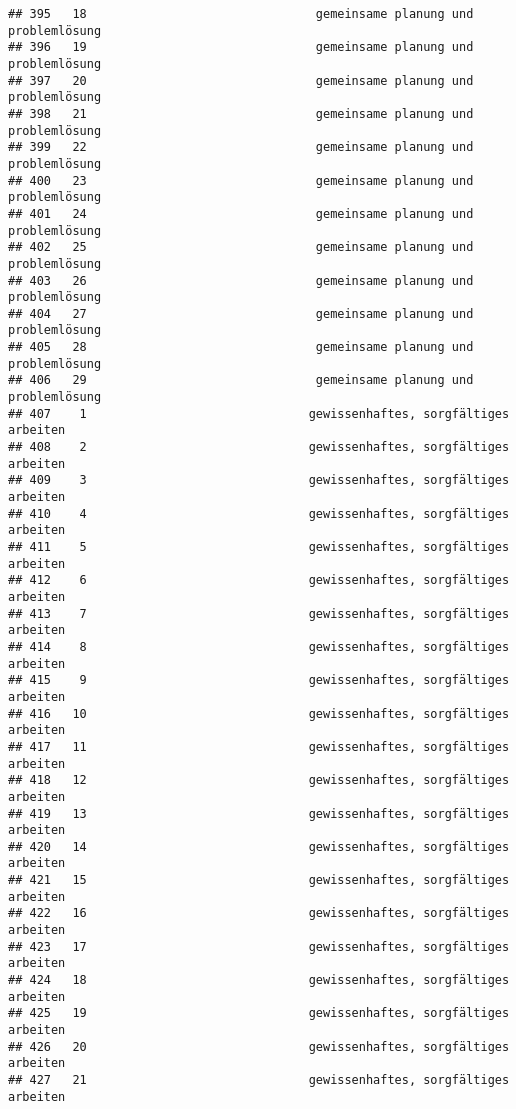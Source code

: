 \documentclass[
]{article}
\begin{document}
\begin{verbatim}
## 395   18                                gemeinsame planung und problemlösung
## 396   19                                gemeinsame planung und problemlösung
## 397   20                                gemeinsame planung und problemlösung
## 398   21                                gemeinsame planung und problemlösung
## 399   22                                gemeinsame planung und problemlösung
## 400   23                                gemeinsame planung und problemlösung
## 401   24                                gemeinsame planung und problemlösung
## 402   25                                gemeinsame planung und problemlösung
## 403   26                                gemeinsame planung und problemlösung
## 404   27                                gemeinsame planung und problemlösung
## 405   28                                gemeinsame planung und problemlösung
## 406   29                                gemeinsame planung und problemlösung
## 407    1                               gewissenhaftes, sorgfältiges arbeiten
## 408    2                               gewissenhaftes, sorgfältiges arbeiten
## 409    3                               gewissenhaftes, sorgfältiges arbeiten
## 410    4                               gewissenhaftes, sorgfältiges arbeiten
## 411    5                               gewissenhaftes, sorgfältiges arbeiten
## 412    6                               gewissenhaftes, sorgfältiges arbeiten
## 413    7                               gewissenhaftes, sorgfältiges arbeiten
## 414    8                               gewissenhaftes, sorgfältiges arbeiten
## 415    9                               gewissenhaftes, sorgfältiges arbeiten
## 416   10                               gewissenhaftes, sorgfältiges arbeiten
## 417   11                               gewissenhaftes, sorgfältiges arbeiten
## 418   12                               gewissenhaftes, sorgfältiges arbeiten
## 419   13                               gewissenhaftes, sorgfältiges arbeiten
## 420   14                               gewissenhaftes, sorgfältiges arbeiten
## 421   15                               gewissenhaftes, sorgfältiges arbeiten
## 422   16                               gewissenhaftes, sorgfältiges arbeiten
## 423   17                               gewissenhaftes, sorgfältiges arbeiten
## 424   18                               gewissenhaftes, sorgfältiges arbeiten
## 425   19                               gewissenhaftes, sorgfältiges arbeiten
## 426   20                               gewissenhaftes, sorgfältiges arbeiten
## 427   21                               gewissenhaftes, sorgfältiges arbeiten

\end{verbatim}
\end{document}
